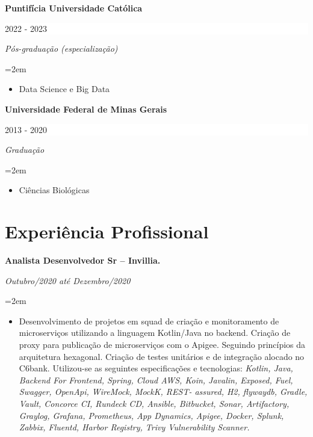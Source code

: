 \documentclass[paper=a4,fontsize=11pt]{scrartcl} %
\newcommand{\NewPart}[1]{\section*{{#1}}}
\newcommand{\EducationEntry}[4]{
		\noindent \textbf{#1} \hfill      %
		\colorbox{White}{%
			\parbox{5cm}{%
			\hfill\color{Black}#2}} \par  %
		\noindent \textit{#3} \par        %
		\noindent\hangindent=2em\hangafter=0 \small #4 %
		\normalsize \par}
\begin{document}
\EducationEntry{Puntifícia Universidade Católica}{2022 - 2023}{Pós-graduação (especialização)}{
	\begin{itemize}
		\item{Data Science e Big Data }

	\end{itemize}
}

\EducationEntry{Universidade Federal de Minas Gerais}{2013 - 2020}{Graduação}{
	\begin{itemize}
		\item{Ciências Biológicas }

	\end{itemize}
}

\NewPart{Experiência Profissional}{}

\EducationEntry{Analista Desenvolvedor Sr – Invillia.}{}{Outubro/2020 até Dezembro/2020}{
	\begin{itemize}
		\item{Desenvolvimento de projetos em squad de criação e monitoramento de microserviços
		      utilizando a linguagem Kotlin/Java no backend. Criação de proxy para publicação de
		      microserviços com o Apigee. Seguindo princípios da arquitetura hexagonal.
			  Criação de testes unitários e de integração alocado no C6bank. Utilizou-se as 
			  seguintes especificações e tecnologias: \newline \newline 
		      \textit{Kotlin, Java, Backend For Frontend, Spring, Cloud AWS, Koin, Javalin, Exposed, Fuel, Swagger, OpenApi, WireMock, MockK, REST-
			      assured, H2, flywaydb, Gradle, Vault, Concorce CI, Rundeck CD, Ansible, Bitbucket,
			      Sonar, Artifactory, Graylog, Grafana, Prometheus, App Dynamics, Apigee, Docker, Splunk,
			      Zabbix, Fluentd, Harbor Registry, Trivy Vulnerability Scanner.}}

	\end{itemize}
}
\end{document}
